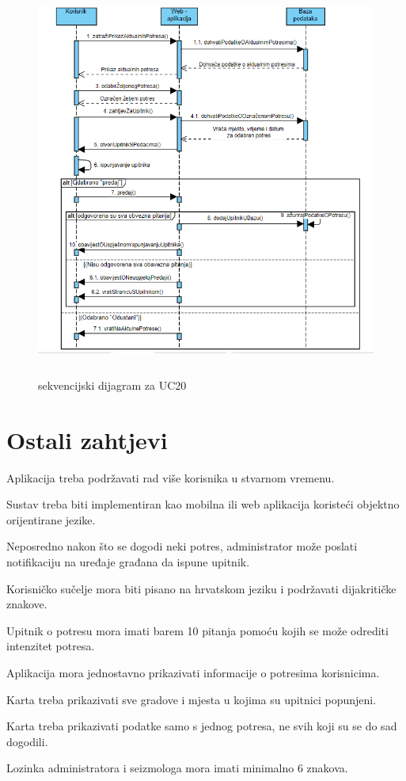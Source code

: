 			\begin{figure}[H]
				  \includegraphics[width=\textwidth, height=13cm]{slike/uc20.PNG}
				  \caption{sekvencijski dijagram za UC20}
				  \label{fig:sekvuc8} 
				 \end{figure}
				\eject
	
		\section{Ostali zahtjevi}
				\begin{packed_item}
					\item Aplikacija treba podržavati rad više korisnika u stvarnom vremenu.
					\item Sustav treba biti implementiran kao mobilna ili web aplikacija koristeći objektno orijentirane jezike.
					\item Neposredno nakon što se dogodi neki potres, administrator može poslati notifikaciju na uređaje građana da ispune upitnik.
					\item Korisničko sučelje mora biti pisano na hrvatskom jeziku i podržavati dijakritičke znakove.
					\item Upitnik o potresu mora imati barem 10 pitanja pomoću kojih se može odrediti intenzitet potresa.
					\item Aplikacija mora jednostavno prikazivati informacije o potresima korisnicima.
					\item Karta treba prikazivati sve gradove i mjesta u kojima su upitnici popunjeni.
					\item Karta treba prikazivati podatke samo s jednog potresa, ne svih koji su se do sad dogodili.
					\item Lozinka administratora i seizmologa mora imati minimalno 6 znakova.
				\end{packed_item}